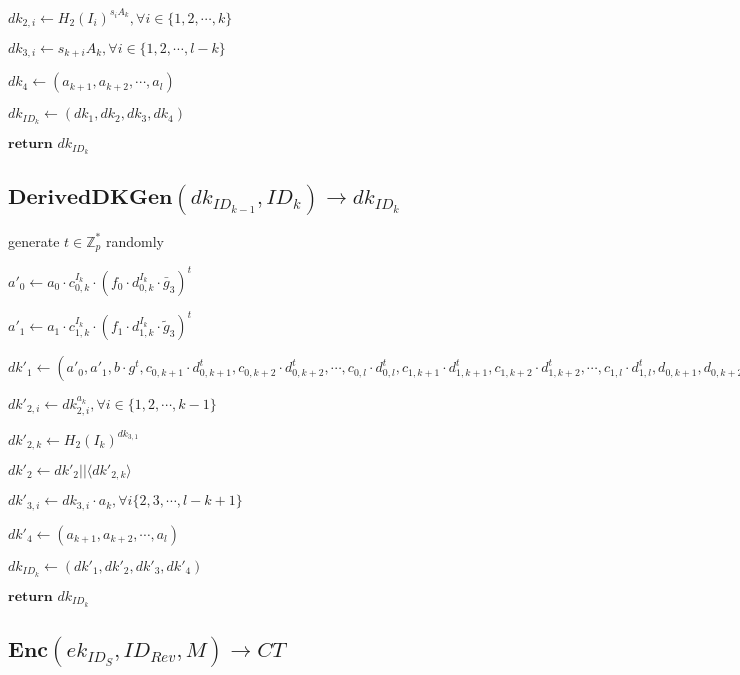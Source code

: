\documentclass[a4paper]{article}
\begin{document}
$\textit{dk}_{2, i} \gets H_2(I_i)^{s_i A_k}, \forall i \in \{1, 2, \cdots, k\}$

$\textit{dk}_{3, i} \gets s_{k + i}A_k, \forall i \in \{1, 2, \cdots, l - k\}$

$\textit{dk}_4 \gets (a_{k + 1}, a_{k + 2}, \cdots, a_l)$

$\textit{dk}_{\textit{ID}_k} \gets (\textit{dk}_1, \textit{dk}_2, \textit{dk}_3, \textit{dk}_4)$

$\textbf{return }\textit{dk}_{\textit{ID}_k}$

\subsection{$\textbf{DerivedDKGen}(\textit{dk}_{\textit{ID}_{k - 1}}, \textit{ID}_k) \rightarrow \textit{dk}_{\textit{ID}_k}$}

generate $t \in \mathbb{Z}_p^*$ randomly

$a'_0 \gets a_0 \cdot c_{0, k}^{I_k} \cdot (f_0 \cdot d_{0, k}^{I_k} \cdot \bar{g}_3)^t$

$a'_1 \gets a_1 \cdot c_{1, k}^{I_k} \cdot (f_1 \cdot d_{1, k}^{I_k} \cdot \tilde{g}_3)^t$

$\textit{dk}'_1 \gets (
a'_0, a'_1, b \cdot g^t, 
c_{0, k + 1} \cdot d_{0, k + 1}^t, c_{0, k + 2} \cdot d_{0, k + 2}^t, \cdots, c_{0, l} \cdot d_{0, l}^t, 
c_{1, k + 1} \cdot d_{1, k + 1}^t, c_{1, k + 2} \cdot d_{1, k + 2}^t, \cdots, c_{1, l} \cdot d_{1, l}^t, 
d_{0, k + 1}, d_{0, k + 2}, \cdots, d_{0, l}, 
d_{1, k + 1}, d_{1, k + 2}, \cdots, d_{1, l}, 
f_0 \cdot c_{0, k}^{I_k}, f_1 \cdot c_{1, k}^{I_k}
)$

$\textit{dk}'_{2, i} \gets \textit{dk}_{2, i}^{a_k}, \forall i \in \{1, 2, \cdots, k - 1\}$

$\textit{dk}'_{2, k} \gets H_2(I_k)^{\textit{dk}_{3, 1}}$

$\textit{dk}'_2 \gets \textit{dk}'_2 || \langle\textit{dk}'_{2, k}\rangle$

$\textit{dk}'_{3, i} \gets \textit{dk}_{3, i} \cdot a_k, \forall i \{2, 3, \cdots, l - k + 1\}$

$\textit{dk}'_4 \gets (a_{k + 1}, a_{k + 2}, \cdots, a_l)$

$\textit{dk}_{\textit{ID}_k} \gets (\textit{dk}'_1, \textit{dk}'_2, \textit{dk}'_3, \textit{dk}'_4)$

$\textbf{return }\textit{dk}_{\textit{ID}_k}$

\subsection{$\textbf{Enc}(\textit{ek}_{\textit{ID}_S}, \textit{ID}_\textit{Rev}, M) \rightarrow \textit{CT}$}
\end{document}

